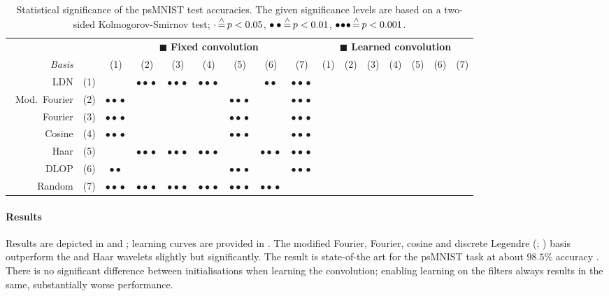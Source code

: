 \begin{table}
	\newcommand{\sigA}{\ensuremath{\cdot}}
	\newcommand{\sigB}{\ensuremath{\bullet\bullet}}
	\newcommand{\sigC}{\ensuremath{\bullet\!\bullet\!\bullet}}
	\caption[Statistical significance of the psMNiST test accuracies]{Statistical significance of the psMNIST test accuracies. The given significance levels are based on a two-sided Kolmogorov-Smirnov test; $\sigA \correspondsTo p < 0.05$, $\sigB \correspondsTo p < 0.01$, $\sigC \correspondsTo p < 0.001$.}
	\label{tbl:psmnist_significance}
	\centering\small\sffamily
	\setlength{\tabcolsep}{6.2pt}
	\begin{tabular}{r r  c c c c c c c  c c c c c c c}
	\toprule
	& & \multicolumn{7}{c}{{\color{skyblue1}$\blacksquare$} \textbf{Fixed convolution}}
	& \multicolumn{7}{c}{{\color{aluminium2}$\blacksquare$} \textbf{Learned convolution}} \\
	\cmidrule(r){3-9}\cmidrule(l){10-16}
	\emph{Basis} & & (1) & (2) & (3) & (4) & (5) & (6) & (7)  & (1) & (2) & (3) & (4) & (5) & (6) & (7) \\
	\midrule
	\symLTI~LDN & (1) &
		 &
		\sigC &
		\sigC &
		\sigC &
		 &
		\sigB &
		\sigC &
		 &
		 &
		 &
		 &
		 &
		 &
		 \\
		\symLTI~Mod.~Fourier & (2) &
		\sigC &
		 &
		 &
		 &
		\sigC &
		 &
		\sigC &
		 &
		 &
		 &
		 &
		 &
		 &
		 \\
		\symSDT~Fourier & (3) &
		\sigC &
		 &
		 &
		 &
		\sigC &
		 &
		\sigC &
		 &
		 &
		 &
		 &
		 &
		 &
		 \\
		\symSDT~Cosine & (4) &
		\sigC &
		 &
		 &
		 &
		\sigC &
		 &
		\sigC &
		 &
		 &
		 &
		 &
		 &
		 &
		 \\
		\symSDT~Haar & (5) &
		 &
		\sigC &
		\sigC &
		\sigC &
		 &
		\sigC &
		\sigC &
		 &
		 &
		 &
		 &
		 &
		 &
		 \\
		\symFIR~DLOP & (6) &
		\sigB &
		 &
		 &
		 &
		\sigC &
		 &
		\sigC &
		 &
		 &
		 &
		 &
		 &
		 &
		 \\
		\symFIR~Random & (7) &
		\sigC &
		\sigC &
		\sigC &
		\sigC &
		\sigC &
		\sigC &
		 &
		 &
		 &
		 &
		 &
		 &
		 &
		 \\
	\bottomrule
	\end{tabular}
\end{table}

\paragraph{Results}
Results are depicted in  and ; learning curves are provided in .
The modified Fourier, Fourier, cosine and discrete Legendre (\DLOP; ) basis outperform the \LDN and Haar wavelets slightly but significantly.
The \LDN result is state-of-the art for the psMNIST task at about $98.5\%$ accuracy \citep{chilkuri2021parallelizing}.
There is no significant difference between initialisations when learning the convolution; enabling learning on the \FIR filters always results in the same, substantially worse performance.

